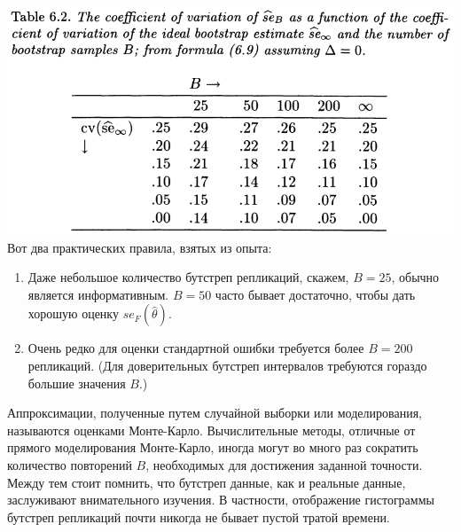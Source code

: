 \noindent
\includegraphics[width=\linewidth]{5/t62.png}
\newline
Вот два практических правила, взятых из опыта:
\begin{enumerate}
    \item Даже небольшое количество бутстреп репликаций, скажем, $B = 25$, обычно является информативным. $B = 50$ часто бывает достаточно, чтобы дать хорошую оценку $se_F (\hat\theta)$.
    \item Очень редко для оценки стандартной ошибки требуется более $B = 200$ репликаций. (Для доверительных бутстреп интервалов требуются гораздо большие значения $B$.) 
\end{enumerate}

Аппроксимации, полученные путем случайной выборки или моделирования, называются оценками Монте-Карло. Вычислительные методы, отличные от прямого моделирования Монте-Карло, иногда могут во много раз сократить количество повторений $B$, необходимых для достижения заданной точности. Между тем стоит помнить, что бутстреп данные, как и реальные данные, заслуживают внимательного изучения. В частности, отображение гистограммы бутстреп репликаций почти никогда не бывает пустой тратой времени. 